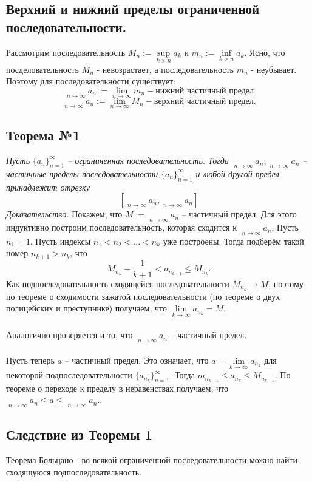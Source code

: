 \documentclass[12pt]{article}
\theoremstyle{definition}
\DeclareMathOperator*\lowlim{\underline{lim}}
\DeclareMathOperator*\uplim{\overline{lim}}
\begin{document}
	\subsection{Верхний и нижний пределы ограниченной последовательности.}
	Рассмотрим последовательность $M_n := \sup\limits_{k>n} a_k$ и $m_n := \inf\limits_{k>n}a_k$. Ясно, что посделовательность $M_n$ - невозрастает, а последовательность $m_n$ - неубывает. Поэтому для \underline{} последовательности существует:\[
	\lowlim\limits_{n\rightarrow\infty} a_n := \lim\limits_{n\rightarrow\infty} m_n - \textbf{нижний частичный предел}
	\] \[
	\uplim\limits_{n\rightarrow\infty} a_n := \lim\limits_{n\rightarrow\infty} M_n - \textbf{верхний частичный предел}.
	\]
	\subsection{Теорема №1}
	\label{subsec:t1}
	\textit{Пусть} $\{a_n\}_{n=1}^{\infty}$ \textit{-- ограниченная последовательность. Тогда} $\uplim\limits_{n \to \infty} a_n, \lowlim\limits_{n \to \infty} a_n$ \textit{-- частичные пределы последовательности} $\{a_n\}_{n=1}^{\infty}$ \textit{и любой другой предел принадлежит отрезку} \[[\lowlim\limits_{n \to \infty} a_n, \uplim\limits_{n \to \infty} a_n]
	\]
	\textit{Доказательство.}
	Покажем, что $M := \uplim\limits_{n \to \infty} a_n$ -- частичный предел. Для этого индуктивно построим последовательность, которая сходится к $\uplim\limits_{n \to \infty} a_n$. Пусть $n_1 = 1$. Пусть индексы $n_1 < n_2 < ... < n_k$ уже построены. Тогда подберём такой номер $n_{k+1} > n_k$, что
	\[
	M_{n_k} - \frac{1}{k+1} < a_{n_{k+1}} \leq M_{n_k}.
	\]
	Как подпоследовательность сходящейся последовательности $M_{n_k} \to M$, поэтому по теореме о сходимости зажатой последовательности (по теореме о двух полицейских и преступнике) получаем, что $\lim\limits_{k \to \infty} a_{n_k} = M$. \\\\
	Аналогично проверяется и то, что $\lowlim\limits_{n \to \infty} a_n$ -- частичный предел. \\\\
	Пусть теперь $a$ -- частичный предел. Это означает, что $a = \lim\limits_{k \to \infty} a_{n_k}$ для некоторой подпоследовательности $\{a_{n_k}\}_{n=1}^{\infty}$. Тогда $m_{n_{k-1}} \leq a_{n_{k}} \leq M_{n_{k-1}}$. По теореме о переходе к пределу в неравенствах получаем, что $\lowlim\limits_{n \to \infty} a_n \leq a \leq \uplim\limits_{n \to \infty} a_n$..
	\subsection{Следствие из Теоремы 1}
	Теорема Больцано - во всякой ограниченной последовательности можно найти сходящуюся подпоследовательность.
\end{document}
